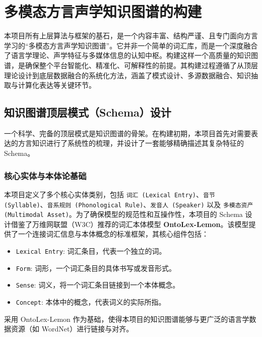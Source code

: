 \chapter{多模态方言声学知识图谱的构建}

本项目所有上层算法与框架的基石，是一个内容丰富、结构严谨、且专门面向方言学习的“多模态方言声学知识图谱”。它并非一个简单的词汇库，而是一个深度融合了语言学理论、声学特征与多媒体信息的认知中枢。构建这样一个高质量的知识图谱，是确保整个平台智能化、精准化、可解释性的前提。其构建过程遵循了从顶层理论设计到底层数据融合的系统化方法，涵盖了模式设计、多源数据融合、知识抽取与计算化表达等关键环节。

\section{知识图谱顶层模式（Schema）设计}
一个科学、完备的顶层模式是知识图谱的骨架。在构建初期，本项目首先对需要表达的方言知识进行了系统性的梳理，并设计了一套能够精确描述其复杂特征的Schema。

\subsection{核心实体与本体论基础}
本项目定义了多个核心实体类别，包括 \texttt{词汇 (Lexical Entry)}、\texttt{音节 (Syllable)}、\texttt{音系规则 (Phonological Rule)}、\texttt{发音人 (Speaker)} 以及 \texttt{多模态资产 (Multimodal Asset)}。为了确保模型的规范性和互操作性，本项目的 Schema 设计借鉴了万维网联盟（W3C）推荐的词汇本体模型 \textbf{OntoLex-Lemon}。该模型提供了一个连接词汇信息与本体概念的标准框架，其核心组件包括：
\begin{itemize}
    \item \texttt{Lexical Entry}: 词汇条目，代表一个独立的词。
    \item \texttt{Form}: 词形，一个词汇条目的具体书写或发音形式。
    \item \texttt{Sense}: 词义，将一个词汇条目链接到一个本体概念。
    \item \texttt{Concept}: 本体中的概念，代表词义的实际所指。
\end{itemize}
采用 OntoLex-Lemon 作为基础，使得本项目的知识图谱能够与更广泛的语言学数据资源（如 WordNet）进行链接与对齐。

